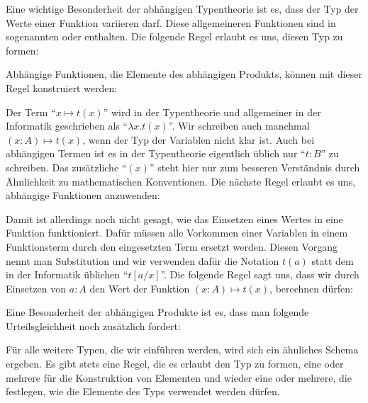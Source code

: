 \documentclass[a4paper,12pt]{article}
\theoremstyle{break}
\theoremstyle{nonumberbreak}
\theoremstyle{nonumberplain}
\begin{document}
Eine wichtige Besonderheit der abhängigen Typentheorie ist es, dass der Typ der Werte einer Funktion variieren darf.
Diese allgemeineren Funktionen sind in sogenannten  oder  enthalten.
Die folgende Regel erlaubt es uns, diesen Typ zu formen:
\begin{mathpar}
\end{mathpar}
Abhängige Funktionen, die Elemente des abhängigen Produkts, können mit dieser Regel konstruiert werden:
\begin{mathpar}
\end{mathpar}
Der Term ``$x\mapsto t(x)$'' wird in der Typentheorie und allgemeiner in der Informatik geschrieben als ``$\lambda x.t(x)$''.
Wir schreiben auch manchmal $(x:A)\mapsto t(x)$, wenn der Typ der Variablen nicht klar ist.
Auch bei abhängigen Termen ist es in der Typentheorie eigentlich üblich nur ``$t:B$'' zu schreiben.
Das zusätzliche ``$(x)$'' steht hier nur zum besseren Verständnis durch Ähnlichkeit zu mathematischen Konventionen.
Die nächste Regel erlaubt es uns, abhängige Funktionen anzuwenden:
\begin{mathpar}
\end{mathpar}
Damit ist allerdings noch nicht gesagt, wie das Einsetzen eines Wertes in eine Funktion funktioniert.
Dafür müssen alle Vorkommen einer Variablen in einem Funktionsterm durch den eingesetzten Term ersetzt werden.
Diesen Vorgang nennt man Substitution und wir verwenden dafür die Notation $t(a)$ statt dem in der Informatik üblichen ``$t[a/x]$''.
Die folgende Regel sagt uns, dass wir durch Einsetzen von $a:A$ den Wert der Funktion $(x:A)\mapsto t(x)$, berechnen dürfen:
\begin{mathpar}
\end{mathpar}
Eine Besonderheit der abhängigen Produkte ist es, dass man folgende Urteilsgleichheit noch zusätzlich fordert:
\begin{mathpar}
\end{mathpar}
Für alle weitere Typen, die wir einführen werden, wird sich ein ähnliches Schema ergeben.
Es gibt stets eine Regel, die es erlaubt den Typ zu formen, eine oder mehrere für die Konstruktion von Elementen und wieder eine oder mehrere, die festlegen, wie die Elemente des Typs verwendet werden dürfen.
\end{document}
